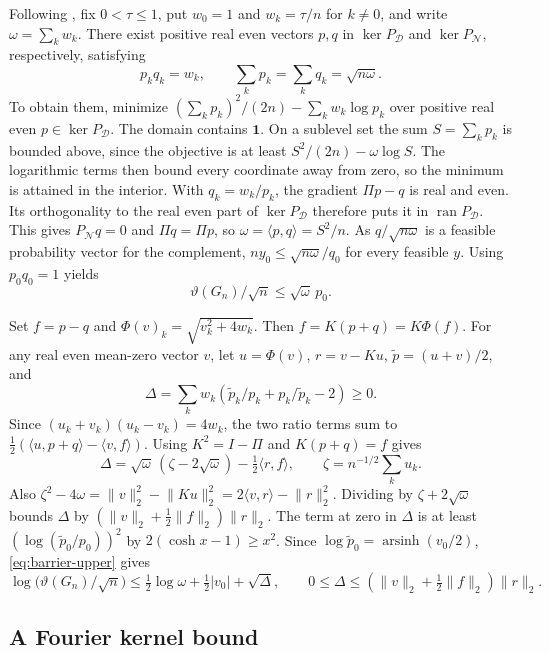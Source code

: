 \documentclass[preprints,article,submit,oneauthor]{Definitions/mdpi}
\newcommand{\one}{\mathbf 1}
\newcommand{\abs}[1]{\lvert #1\rvert}
\newcommand{\norm}[1]{\lVert #1\rVert}
\begin{document}
Following \cite{CHHWY}, fix \(0<\tau\le1\), put \(w_0=1\) and
\(w_k=\tau/n\) for \(k\ne0\), and write \(\omega=\sum_k w_k\).
There exist positive real even vectors \(p,q\) in \(\ker P_{\mathcal D}\)
and \(\ker P_{\mathcal N}\), respectively, satisfying
\[
 p_kq_k=w_k,\qquad \sum_k p_k=\sum_k q_k=\sqrt{n\omega}.
\]
To obtain them, minimize
\((\sum_k p_k)^2/(2n)-\sum_k w_k\log p_k\) over positive real even
\(p\in\ker P_{\mathcal D}\). The domain contains \(\one\).
On a sublevel set the sum \(S=\sum_k p_k\) is bounded above, since the
objective is at least \(S^2/(2n)-\omega\log S\). The logarithmic terms then
bound every coordinate away from zero, so the minimum is attained
in the interior. With \(q_k=w_k/p_k\), the gradient \(\Pi p-q\) is
real and even. Its orthogonality to the real even part of
\(\ker P_{\mathcal D}\) therefore puts it in
\(\operatorname{ran}P_{\mathcal D}\). This gives
\(P_{\mathcal N}q=0\) and \(\Pi q=\Pi p\), so
\(\omega=\langle p,q\rangle=S^2/n\). As \(q/\sqrt{n\omega}\) is a feasible
probability vector for the complement, \(ny_0\le\sqrt{n\omega}/q_0\)
for every feasible \(y\). Using \(p_0q_0=1\) yields
\begin{equation}\label{eq:barrier-upper}
 \vartheta(G_n)/\sqrt n\le\sqrt\omega\,p_0.
\end{equation}

Set \(f=p-q\) and \(\Phi(v)_k=\sqrt{v_k^2+4w_k}\). Then
\(f=K(p+q)=K\Phi(f)\). For any real even mean-zero vector \(v\), let
\(u=\Phi(v)\), \(r=v-Ku\), \(\widetilde p=(u+v)/2\), and
\[
 \Delta=\sum_k w_k(\widetilde p_k/p_k+p_k/\widetilde p_k-2)\ge0.
\]
Since \((u_k+v_k)(u_k-v_k)=4w_k\), the two ratio terms sum to
\(\tfrac12(\langle u,p+q\rangle-\langle v,f\rangle)\). Using
\(K^2=I-\Pi\) and \(K(p+q)=f\) gives
\[
 \Delta=\sqrt\omega\,(\zeta-2\sqrt\omega)-\tfrac12\langle r,f\rangle,
 \qquad \zeta=n^{-1/2}\sum_k u_k.
\]
Also \(\zeta^2-4\omega=\norm{v}_2^2-\norm{Ku}_2^2=2\langle v,r\rangle-\norm{r}_2^2\).
Dividing by \(\zeta+2\sqrt\omega\) bounds \(\Delta\) by
\((\norm v_2+\tfrac12\norm f_2)\norm r_2\).
The term at zero in \(\Delta\) is at least \((\log(\widetilde p_0/p_0))^2\)
by \(2(\cosh x-1)\ge x^2\). Since
\(\log\widetilde p_0=\operatorname{arsinh}(v_0/2)\),
\eqref{eq:barrier-upper} gives
\begin{equation}\label{eq:residual}
 \log\bigl(\vartheta(G_n)/\sqrt n\bigr)
 \le \tfrac12\log\omega+\tfrac12\abs{v_0}+\sqrt\Delta,
 \qquad 0\le\Delta\le(\norm v_2+\tfrac12\norm f_2)\norm r_2.
\end{equation}

\subsection{A Fourier kernel bound}
\end{document}
